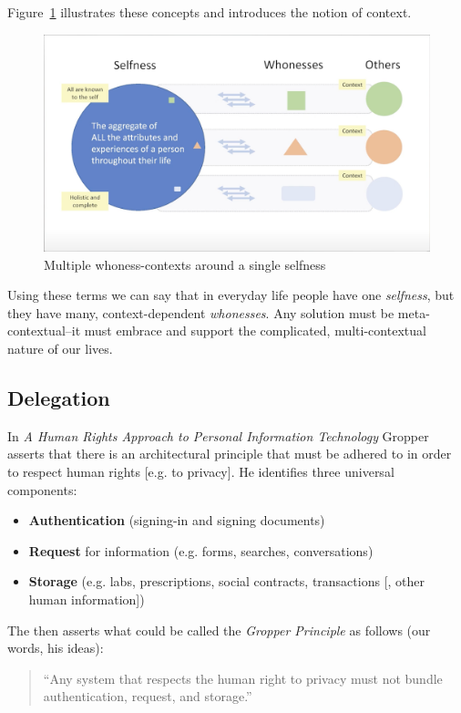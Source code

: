\documentclass[11pt, oneside]{article}   	%
\begin{document}
Figure~\ref{fig:multiple-contexts} illustrates these concepts and introduces the notion of context.

\begin{figure}[htbp]
\includegraphics[width=\textwidth]{./images/selfness-and-whoness-larger.png}
\caption{Multiple whoness-contexts around a single selfness}
\label{fig:multiple-contexts}
\end{figure}

Using these terms we can say that in everyday life people have one \emph{selfness}, but they have many, context-dependent \emph{whonesses}. Any solution must be meta-contextual--it must embrace and support the complicated, multi-contextual nature of our lives.

\subsection{Delegation}

In \emph{A Human Rights Approach to Personal Information Technology}\cite{Gropper2022} Gropper asserts that there is an architectural principle that must be adhered to in order to respect human rights [e.g. to privacy]. He identifies three universal components:

\begin{itemize}
\item \textbf{Authentication} (signing-in and signing documents)
\item \textbf{Request} for information (e.g. forms, searches, conversations)
\item \textbf{Storage} (e.g. labs, prescriptions, social contracts, transactions [, other human information])
\end{itemize}

The then asserts what could be called the \emph{Gropper Principle} as follows (our words, his ideas):
\begin{quote}
``Any system that respects the human right to privacy must not bundle authentication, request, and storage.''
\end{quote}
\end{document}
